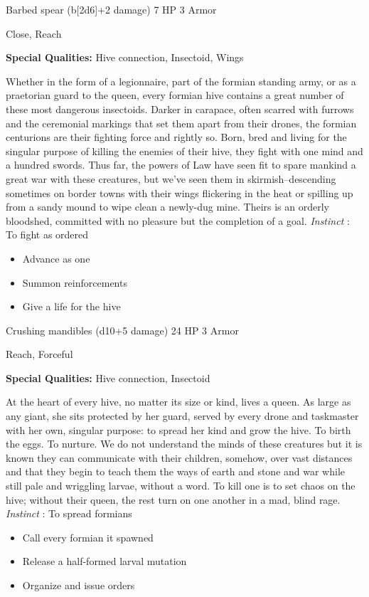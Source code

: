 

 Barbed spear (b[2d6]+2 damage) 7 HP 3 Armor


 Close, Reach


 \textbf{Special Qualities:}
 Hive connection, Insectoid, Wings


 Whether in the form of a legionnaire, part of the formian standing army, or as a praetorian guard to the queen, every formian hive contains a great number of these most dangerous insectoids. Darker in carapace, often scarred with furrows and the ceremonial markings that set them apart from their drones, the formian centurions are their fighting force and rightly so. Born, bred and living for the singular purpose of killing the enemies of their hive, they fight with one mind and a hundred swords. Thus far, the powers of Law have seen fit to spare mankind a great war with these creatures, but we've seen them in skirmish--descending sometimes on border towns with their wings flickering in the heat or spilling up from a sandy mound to wipe clean a newly-dug mine. Theirs is an orderly bloodshed, committed with no pleasure but the completion of a goal. \emph{Instinct}
: To fight as ordered
\begin{itemize}
\item Advance as one
\item Summon reinforcements
\item Give a life for the hive

\end{itemize}




 Crushing mandibles (d10+5 damage) 24 HP 3 Armor


 Reach, Forceful


 \textbf{Special Qualities:}
 Hive connection, Insectoid


 At the heart of every hive, no matter its size or kind, lives a queen. As large as any giant, she sits protected by her guard, served by every drone and taskmaster with her own, singular purpose: to spread her kind and grow the hive. To birth the eggs. To nurture. We do not understand the minds of these creatures but it is known they can communicate with their children, somehow, over vast distances and that they begin to teach them the ways of earth and stone and war while still pale and wriggling larvae, without a word. To kill one is to set chaos on the hive; without their queen, the rest turn on one another in a mad, blind rage. \emph{Instinct}
: To spread formians
\begin{itemize}
\item Call every formian it spawned
\item Release a half-formed larval mutation
\item Organize and issue orders

\end{itemize}


